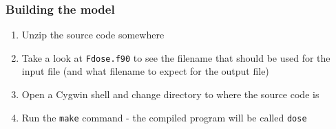 \documentclass[10pt,a4paper]{article}
\newcommand{\bslash}{\symbol{92}}
\begin{document}
\subsubsection*{Building the model}

\begin{enumerate}

\item Unzip the source code somewhere

\item Take a look at \texttt{F{\bslash}dose.f90} to see the filename that should be used for the 
input file (and what filename to expect for the output file)

\item Open a Cygwin shell and change directory to where the source code is

\item Run the \texttt{make} command - the compiled program will be called \texttt{dose}

\end{enumerate}



\end{document}
